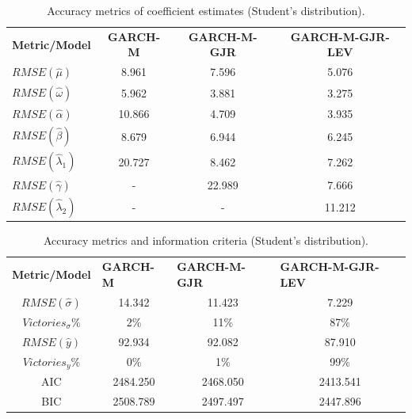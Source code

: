 \documentclass[authoryear, 1p]{elsarticle}
\numberwithin{equation}{section}
\begin{document}
\begin{table}[h!]
\centering
\caption{Accuracy metrics of coefficient estimates (Student's distribution).}
\label{tab:ap_1}
\begin{tabular}{lccc}
\hline
\hline
\textbf{Metric/Model}    & \textbf{GARCH-M} & \textbf{GARCH-M-GJR} & \textbf{GARCH-M-GJR-LEV} \\
$RMSE(\hat{\mu})$        & 8.961    & 7.596    & 5.076  \\
$RMSE(\hat{\omega})$     & 5.962    & 3.881    & 3.275  \\
$RMSE(\hat{\alpha})$     & 10.866   & 4.709    & 3.935  \\
$RMSE(\hat{\beta})$      & 8.679    & 6.944    & 6.245  \\
$RMSE(\hat{\lambda}_1)$  & 20.727   & 8.462    & 7.262  \\
$RMSE(\hat{\gamma})$     & -        & 22.989   & 7.666  \\
$RMSE(\hat{\lambda}_2)$  & -        & -        & 11.212 \\  
\hline
\hline
\end{tabular}
\end{table}

\begin{table}[h!]
\centering
\caption{Accuracy metrics and information criteria (Student's distribution).}
\label{tab:ap_2}
\begin{tabular}{cccc}
\hline
\hline
\textbf{Metric/Model} & \multicolumn{1}{l}{\textbf{GARCH-M}} & \multicolumn{1}{l}{\textbf{GARCH-M-GJR}} & \multicolumn{1}{l}{\textbf{GARCH-M-GJR-LEV}} \\                    
$RMSE(\hat{\sigma})$     & 14.342   & 11.423   & 7.229      \\
$Victories_{\sigma} \%$  & 2\%      & 11\%     & 87\%       \\
$RMSE(\hat{y})$          & 92.934   & 92.082   & 87.910     \\
$Victories_{y} \%$       & 0\%      & 1\%      & 99\%       \\
AIC                      & 2484.250 & 2468.050 & 2413.541   \\
BIC                      & 2508.789 & 2497.497 & 2447.896   \\  
\hline
\hline
\end{tabular}
\end{table}
\end{document}
